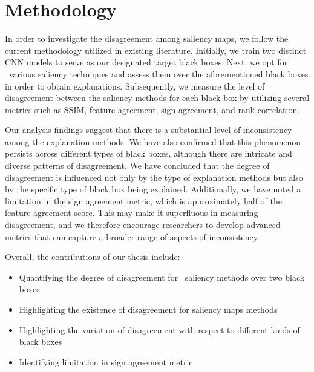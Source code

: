 \section{Methodology}
\label{sec:methodology}

In order to investigate the disagreement among saliency maps, we follow the current methodology utilized in existing literature. Initially, we train two distinct CNN models to serve as our designated target black boxes. Next, we opt for \numExperimentedMethods\ various saliency techniques and assess them over the aforementioned black boxes in order to obtain explanations. Subsequently, we measure the level of disagreement between the saliency methods for each black box by utilizing several metrics such as SSIM, feature agreement, sign agreement, and rank correlation.

Our analysis findings suggest that there is a substantial level of inconsistency among the explanation methods. We have also confirmed that this phenomenon persists across different types of black boxes, although there are intricate and diverse patterns of disagreement. We have concluded that the degree of disagreement is influenced not only by the type of explanation methods but also by the specific type of black box being explained. Additionally, we have noted a limitation in the sign agreement metric, which is approximately half of the feature agreement score. This may make it superfluous in measuring disagreement, and we therefore encourage researchers to develop advanced metrics that can capture a broader range of aspects of inconsistency.

Overall, the contributions of our thesis include:
\begin{itemize}
    \item Quantifying the degree of disagreement for \numExperimentedMethods\ saliency methods over two black boxes
    \item Highlighting the existence of disagreement for saliency maps methods
    \item Highlighting the variation of disagreement with respect to different kinds of black boxes
    \item Identifying limitation in sign agreement metric
\end{itemize}


